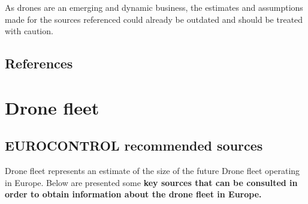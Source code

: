 \documentclass[
  11pt,
  a4paper,
]{book}
\begin{document}
\begin{tcolorbox}[enhanced jigsaw, opacityback=0, arc=.35mm, colframe=quarto-callout-note-color-frame, breakable, left=2mm, leftrule=.75mm, titlerule=0mm, colbacktitle=quarto-callout-note-color!10!white, rightrule=.15mm, opacitybacktitle=0.6, bottomtitle=1mm, colback=white, toptitle=1mm, title=\textcolor{quarto-callout-note-color}{\faInfo}\hspace{0.5em}{Note}, bottomrule=.15mm, toprule=.15mm, coltitle=black]

As drones are an emerging and dynamic business, the estimates and
assumptions made for the sources referenced could already be outdated
and should be treated with caution.

\end{tcolorbox}

\hypertarget{references-33}{%
\section{References}\label{references-33}}

\hypertarget{sec-drone-fleet}{%
\chapter{Drone fleet}\label{sec-drone-fleet}}

\hypertarget{eurocontrol-recommended-sources-3}{%
\section{EUROCONTROL recommended
sources}\label{eurocontrol-recommended-sources-3}}

Drone fleet represents an estimate of the size of the future Drone fleet
operating in Europe. Below are presented some \textbf{key sources that
can be consulted in order to obtain information about the drone fleet in
Europe.}
\end{document}
